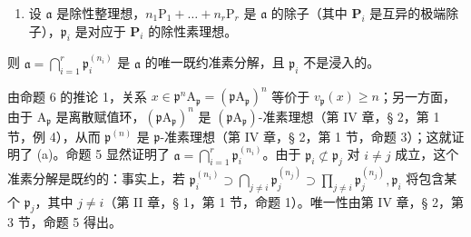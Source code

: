 \begin{enumerate}
\def\labelenumi{(\alph{enumi})}
\setcounter{enumi}{1}
\tightlist
\item
  设 \(\mathfrak{a}\) 是除性整理想，\(n_1\mathrm{P}_1 + \dots + n_r\mathrm{P}_r\) 是 \(\mathfrak{a}\) 的除子（其中 \(\mathbf{P}_i\) 是互异的极端除子），\(\mathfrak{p}_i\) 是对应于 \(\mathbf{P}_i\) 的除性素理想。
\end{enumerate}

则 \(\mathfrak{a} = \bigcap_{i=1}^{r} \mathfrak{p}_i^{(n_i)}\) 是 \(\mathfrak{a}\) 的唯一既约准素分解，且 \(\mathfrak{p}_i\) 不是浸入的。

由命题 6 的推论 1，关系 \(x \in \mathfrak{p}^n\mathrm{A}_{\mathfrak{p}} = (\mathfrak{p}\mathrm{A}_{\mathfrak{p}})^n\) 等价于 \(v_{\mathfrak{p}}(x) \geqslant n\)；另一方面，由于 \(\mathrm{A}_{\mathfrak{p}}\) 是离散赋值环，\((\mathfrak{p}\mathrm{A}_{\mathfrak{p}})^n\) 是 \((\mathfrak{p}\mathrm{A}_{\mathfrak{p}})\)-准素理想（第 IV 章，§ 2，第 1 节，例 4），从而 \(\mathfrak{p}^{(n)}\) 是 \(\mathfrak{p}\)-准素理想（第 IV 章，§ 2，第 1 节，命题 3）；这就证明了 (a)。命题 5 显然证明了 \(\mathfrak{a} = \bigcap_{i=1}^{r} \mathfrak{p}_i^{(n_i)}\)。由于 \(\mathfrak{p}_i \not\subset \mathfrak{p}_j\) 对 \(i \neq j\) 成立，这个准素分解是既约的：事实上，若 \(\mathfrak{p}_i^{(n_i)} \supset \bigcap_{j \neq i} \mathfrak{p}_j^{(n_j)} \supset \prod_{j \neq i} \mathfrak{p}_j^{(n_j)}, \mathfrak{p}_i\) 将包含某个 \(\mathfrak{p}_j\)，其中 \(j \neq i\)（第 II 章，§ 1，第 1 节，命题 1）。唯一性由第 IV 章，§ 2，第 3 节，命题 5 得出。

